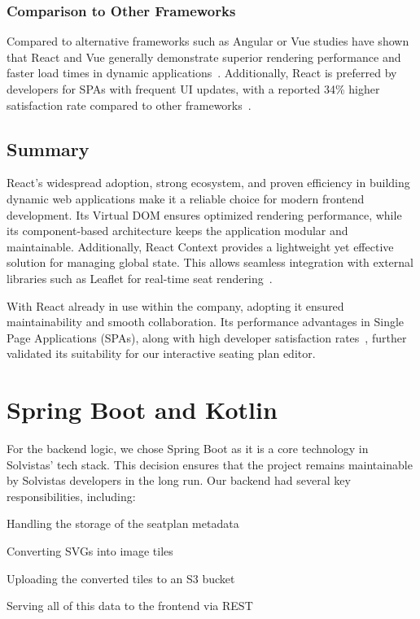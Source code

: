 \subsubsection{Comparison to Other Frameworks}
Compared to alternative frameworks such as Angular or Vue studies have shown that React and Vue generally demonstrate superior rendering performance and faster load times in dynamic applications~\cite{SPAComp}. Additionally, React is preferred by developers for SPAs with frequent UI updates, with a reported 34\% higher satisfaction rate compared to other frameworks~\cite{SPAComp}. 

\subsection{Summary}
React’s widespread adoption, strong ecosystem, and proven efficiency in building dynamic web applications make it a reliable choice for modern frontend development. Its Virtual DOM ensures optimized rendering performance, while its component-based architecture keeps the application modular and maintainable. Additionally, React Context provides a lightweight yet effective solution for managing global state. This allows seamless integration with external libraries such as Leaflet for real-time seat rendering~\cite{ReactVirtualDOM, ReactCBA01}. 

With React already in use within the company, adopting it ensured maintainability and smooth collaboration. Its performance advantages in Single Page Applications (SPAs), along with high developer satisfaction rates~\cite{SPAComp}, further validated its suitability for our interactive seating plan editor.

\section{Spring Boot and Kotlin}
For the backend logic, we chose Spring Boot as it is a core technology in Solvistas’ tech stack. This decision ensures that the project remains maintainable by Solvistas developers in the long run. Our backend had several key responsibilities, including:
\begin{compactitem}
    \item Handling the storage of the seatplan metadata
    \item Converting SVGs into image tiles
    \item Uploading the converted tiles to an S3 bucket
    \item Serving all of this data to the frontend via REST
\end{compactitem}


